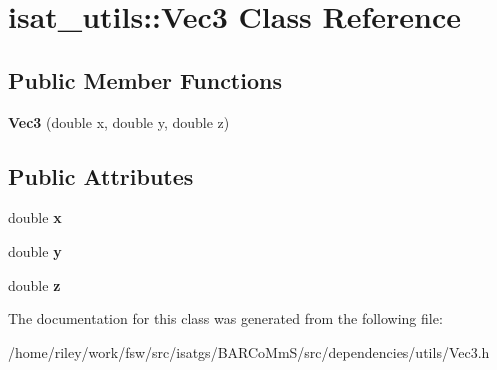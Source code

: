 \hypertarget{classisat__utils_1_1_vec3}{}\section{isat\+\_\+utils\+:\+:Vec3 Class Reference}
\label{classisat__utils_1_1_vec3}
\subsection*{Public Member Functions}
\begin{DoxyCompactItemize}
\item 
{\bfseries Vec3} (double x, double y, double z)\hypertarget{classisat__utils_1_1_vec3_a36716f8c4564b72e34c0485f80438141}{}\label{classisat__utils_1_1_vec3_a36716f8c4564b72e34c0485f80438141}

\end{DoxyCompactItemize}
\subsection*{Public Attributes}
\begin{DoxyCompactItemize}
\item 
double {\bfseries x}\hypertarget{classisat__utils_1_1_vec3_a45a412162a0c4238fd62a68721c63713}{}\label{classisat__utils_1_1_vec3_a45a412162a0c4238fd62a68721c63713}

\item 
double {\bfseries y}\hypertarget{classisat__utils_1_1_vec3_a6afa081009fcce193fe7d7bd74880bbd}{}\label{classisat__utils_1_1_vec3_a6afa081009fcce193fe7d7bd74880bbd}

\item 
double {\bfseries z}\hypertarget{classisat__utils_1_1_vec3_af4faa62c195b799205882aef0b9e4e12}{}\label{classisat__utils_1_1_vec3_af4faa62c195b799205882aef0b9e4e12}

\end{DoxyCompactItemize}


The documentation for this class was generated from the following file\+:\begin{DoxyCompactItemize}
\item 
/home/riley/work/fsw/src/isatgs/\+B\+A\+R\+Co\+Mm\+S/src/dependencies/utils/Vec3.\+h\end{DoxyCompactItemize}
